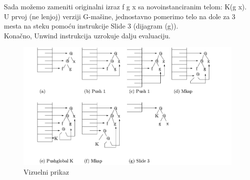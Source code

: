 Sada možemo zameniti originalni izraz f g x  sa novoinstanciranim telom: K(g x). U prvoj (ne lenjoj) verziji G-mašine, jednostavno pomerimo telo na dole za 3 mesta na steku pomoću instrukcije Slide 3 (dijagram (g)).\\ Konačno, Unwind instrukcija uzrokuje dalju evaluaciju.\\
\begin{figure}[h!]
\begin{center}
\includegraphics[scale=0.35]{primerGmasine.png}
\end{center}
\caption{Vizuelni prikaz}
\label{fig:primerGmasine}
\end{figure}


